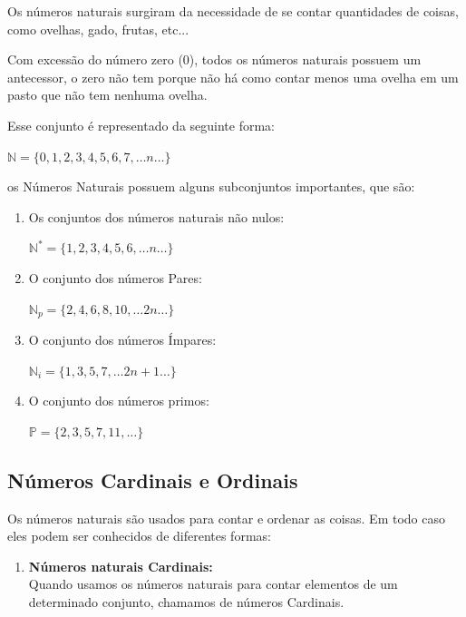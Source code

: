 \begin{multicols*}{2}
    Os números naturais surgiram da necessidade de se contar quantidades de coisas, como ovelhas, gado, frutas, etc...

    Com excessão do número zero (0), todos os números naturais possuem um antecessor, o zero não tem porque não há como contar menos uma ovelha em um pasto que não tem nenhuma ovelha.

    Esse conjunto é representado da seguinte forma:

    $\mathbb{N} = \{{0, 1, 2, 3, 4, 5, 6, 7, \dots n \dots\}}$

    os Números Naturais possuem alguns subconjuntos importantes, que são:

    \begin{enumerate}

        \item Os conjuntos dos números naturais não nulos:

              $\mathbb{N}^* = \{{ 1, 2, 3, 4, 5, 6, \dots n \dots\}}$

        \item O conjunto dos números Pares:

              $\mathbb{N}_p = \{{ 2, 4, 6, 8, 10, \dots 2n \dots\}}$

        \item O conjunto dos números Ímpares:

              $\mathbb{N}_i = \{{ 1, 3, 5, 7,  \dots 2n+1 \dots\}}$

        \item O conjunto dos números primos:

              $\mathbb{P} = \{{ 2, 3, 5, 7, 11, \dots \}}$

    \end{enumerate}

    \subsection{Números Cardinais e Ordinais}

    Os números naturais são usados para contar e ordenar as coisas. Em todo caso eles podem ser conhecidos de diferentes formas:

    \begin{enumerate}

        \item \textbf{Números naturais Cardinais:}\\

              Quando usamos os números naturais para contar elementos de um determinado conjunto, chamamos de números Cardinais.


\end{enumerate}
\end{multicols*}

